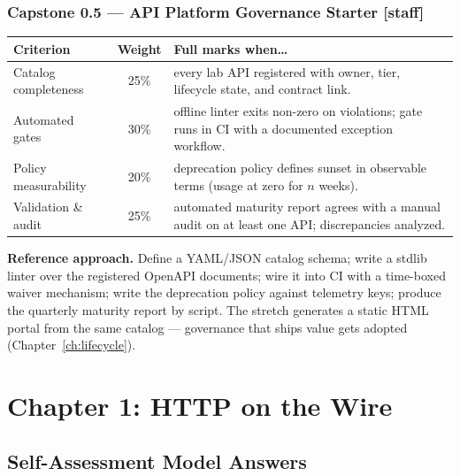 \subsubsection*{Capstone 0.5 --- API Platform Governance Starter [staff]}
\begin{center}\small
\begin{tabularx}{\textwidth}{l c X}
\toprule
\textbf{Criterion} & \textbf{Weight} & \textbf{Full marks when\ldots} \\
\midrule
Catalog completeness & 25\% & every lab API registered with owner, tier, lifecycle state, and contract link. \\
Automated gates & 30\% & offline linter exits non-zero on violations; gate runs in CI with a documented exception workflow. \\
Policy measurability & 20\% & deprecation policy defines sunset in observable terms (usage at zero for $n$ weeks). \\
Validation \& audit & 25\% & automated maturity report agrees with a manual audit on at least one API; discrepancies analyzed. \\
\bottomrule
\end{tabularx}
\end{center}
\textbf{Reference approach.} Define a YAML/JSON catalog schema; write a
stdlib linter over the registered OpenAPI documents; wire it into CI with a
time-boxed waiver mechanism; write the deprecation policy against telemetry
keys; produce the quarterly maturity report by script. The stretch generates
a static HTML portal from the same catalog --- governance that ships value
gets adopted (Chapter~\ref{ch:lifecycle}).

\section{Chapter 1: HTTP on the Wire}
\label{sec:sol-ch1}

\subsection{Self-Assessment Model Answers}

